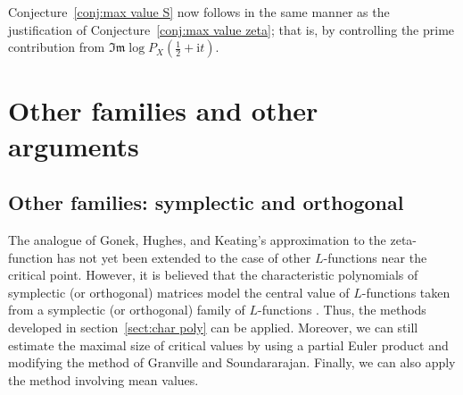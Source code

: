 \documentclass[10pt,reqno,twoside]{amsart}
\renewcommand{\i}{{\mathrm{i}}} %
\renewcommand{\Im}{{\mathfrak{Im}}}
\numberwithin{equation}{section}
\numberwithin{theorem}{section}
\begin{document}
{{Conjecture~\ref{conj:max value S} now follows in the same manner as
the justification of Conjecture~\ref{conj:max value zeta}; that is, by controlling
the prime contribution from $\Im\log  P_X(\tfrac12+\i t)$.






\section{Other families and other arguments}\label{sect:other}

\subsection{Other families: symplectic and orthogonal}

The analogue of Gonek,  Hughes,  and Keating's approximation to
the zeta-function has not yet been extended to the case of other
$L$-functions near the critical point.  However, it is believed
that the characteristic polynomials of symplectic (or orthogonal)
matrices model the central value of $L$-functions taken from a
symplectic (or orthogonal) family of $L$-functions \cite{KS2}.
Thus, the methods developed in section~\ref{sect:char poly} can be
applied. Moreover, we can still estimate the maximal size of
critical values by using a partial Euler product and modifying the
method of Granville and Soundararajan. Finally, we can also apply the
method involving mean values.

}}
\end{document}
